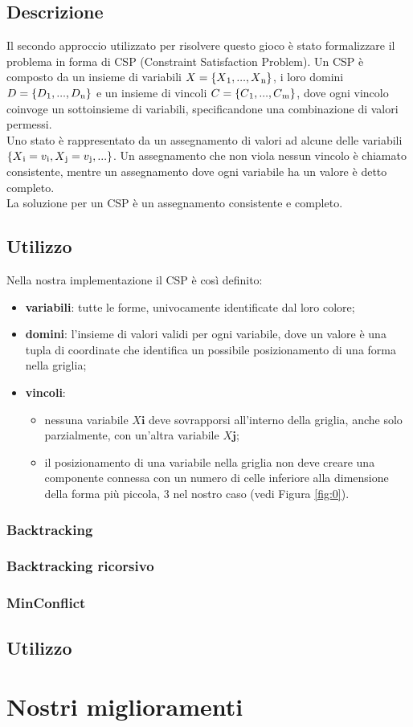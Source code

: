\subsection{Descrizione}
Il secondo approccio utilizzato per risolvere questo gioco è stato formalizzare il problema in forma di CSP (Constraint Satisfaction Problem). Un CSP è composto da un insieme di variabili $X = \{X\textsubscript{1},...,X\textsubscript{n}\}$, i loro domini  $D = \{D\textsubscript{1},...,D\textsubscript{n}\}$ e un insieme di vincoli  $C = \{C\textsubscript{1},...,C\textsubscript{m}\}$, dove ogni vincolo coinvoge un sottoinsieme di variabili, specificandone una combinazione di valori permessi.\\
Uno stato è rappresentato da un assegnamento di valori ad alcune delle variabili $\{X\textsubscript{i} = v\textsubscript{i}, X\textsubscript{j} = v\textsubscript{j},...\}$.
Un assegnamento che non viola nessun vincolo è chiamato consistente, mentre un assegnamento dove ogni variabile ha un valore è detto completo. \\
La soluzione per un CSP è un assegnamento consistente e completo.

\subsection{Utilizzo}
Nella nostra implementazione il CSP è così definito:
\begin{itemize}
	\item \textbf{variabili}: tutte le forme, univocamente identificate dal loro colore;
	\item \textbf{domini}: l'insieme di valori validi per ogni variabile, dove un valore è una tupla di coordinate che identifica un possibile posizionamento di una forma nella griglia;
	\item \textbf{vincoli}: 
		\begin{itemize}
			\item nessuna variabile $X\textbf{i}$ deve sovrapporsi all'interno della griglia, anche solo parzialmente, con un'altra variabile $X\textbf{j}$;
			\item il posizionamento di una variabile nella griglia non deve creare una componente connessa con un numero di celle inferiore alla dimensione della forma più piccola, 3 nel nostro caso (vedi Figura \ref{fig:0}).
		\end{itemize}
\end{itemize}

\subsubsection{Backtracking}
\subsubsection{Backtracking ricorsivo}
\subsubsection{MinConflict}

\subsection{Utilizzo}
\section{Nostri miglioramenti}